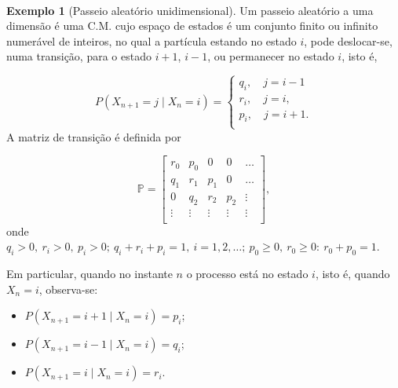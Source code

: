 \documentclass[
  11pt,
  a4paper,
]{book}
\theoremstyle{definition}
\theoremstyle{definition}
\newtheorem{example}{Exemplo}[chapter]
\theoremstyle{definition}
\theoremstyle{definition}
\theoremstyle{remark}
\begin{document}
\(\,\)

\begin{example}[Passeio aleatório unidimensional]

Um passeio aleatório a uma dimensão é uma C.M. cujo espaço de estados é um conjunto finito ou infinito numerável de inteiros, no qual a partícula estando no estado \(i\), pode deslocar-se, numa transição, para o estado \(i+1\), \(i-1\), ou permanecer no estado \(i\), isto é,

\[
P(X_{n+1}=j \mid X_n=i)=
\begin{cases}
q_i, \quad j=i-1\\
r_i, \quad j=i,\\
p_i, \quad j=i+1.\\
\end{cases}
\]
A matriz de transição é definida por

\[\mathbb{P}= \begin{bmatrix}
    r_0 & p_0 & 0 & 0  & \dots \\
    q_1 & r_1 & p_1 & 0  & \dots \\
    0 & q_2 & r_2 & p_2 & \vdots \\
    \vdots & \vdots & \vdots & \vdots & \vdots \\
\end{bmatrix},\]
onde \(q_i>0, ~r_i>0, ~p_i>0; ~q_i+r_i+p_i=1, ~i=1,2,\ldots; ~p_0 \geq 0, ~r_0 \geq 0: ~r_0+p_0=1.\)

Em particular, quando no instante \(n\) o processo está no estado \(i\), isto é, quando \(X_n=i\), observa-se:

\begin{itemize}
\item
  \(P(X_{n+1}=i+1 \mid X_n=i)=p_i\);
\item
  \(P(X_{n+1}=i-1 \mid X_n=i)=q_i\);
\item
  \(P(X_{n+1}=i \mid X_n=i)=r_i\).
\end{itemize}

\end{example}

\(\,\)
\end{document}
